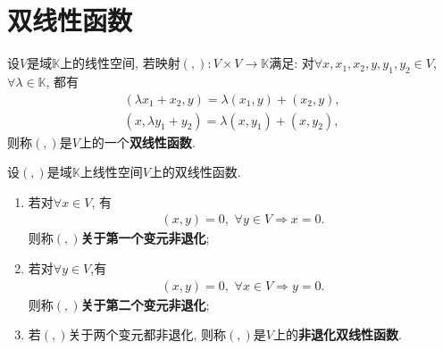 \documentclass[../../main.tex]{subfiles}%
\begin{document}
\section{双线性函数}

\begin{definition}
设$V$是域$\mathbb{K}$上的线性空间, 若映射$(,): V \times V \to \mathbb{K}$满足: 对$\forall x,x_1,x_2,y,y_1,y_2 \in V$,$\forall \lambda \in \mathbb{K}$, 都有
\begin{align*}
(\lambda x_1 + x_2, y) = \lambda (x_1, y) + (x_2, y), \\
(x, \lambda y_1 + y_2) = \lambda (x, y_1) + (x, y_2),
\end{align*}
则称$(,)$是$V$上的一个\textbf{双线性函数}.
\end{definition}

\begin{definition}
设$(,)$是域$\mathbb{K}$上线性空间$V$上的双线性函数. 
\begin{enumerate}[(1)]
\item 若对$\forall x \in V$, 有
\begin{align*}
\left( x,y \right) =0,\,\,\forall y\in V\Longrightarrow x=0.
\end{align*}
则称$(,)$\textbf{关于第一个变元非退化};

\item 若对$\forall y \in V$,有
\begin{align*}
\left( x,y \right) =0,\,\,\forall x\in V\Longrightarrow y=0.
\end{align*}
则称$(,)$\textbf{关于第二个变元非退化};

\item 若$(,)$关于两个变元都非退化, 则称$(,)$是$V$上的\textbf{非退化双线性函数}.
\end{enumerate}
\end{definition}
\end{document}
